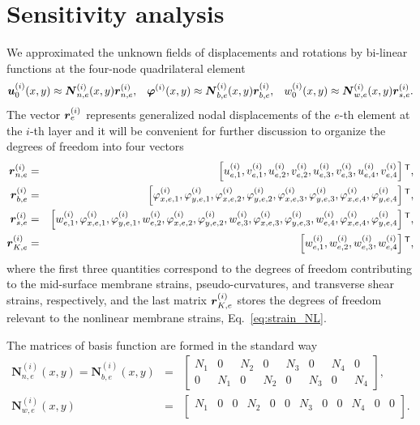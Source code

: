 \documentclass[11pt]{article}
\newcommand{\rot}{\varphi}
\newcommand{\layer}[1]{^{(#1)}}
\newcommand{\el}{_e}
\newcommand{\ele}[1]{_{e,#1}}
\newcommand{\elx}[1]{_{x,e,#1}}
\newcommand{\ely}[1]{_{y,e,#1}}
\newcommand{\elen}{_{n,e}}
\newcommand{\eleb}{_{b,e}}
\newcommand{\eles}{_{s,e}}
\newcommand{\eleNL}{_{K,e}}
\newcommand{\M}[1]{{\boldsymbol #1}}
\newcommand{\elew}{_{w,e}}
\begin{document}
\section{Sensitivity analysis}\label{app:sensitivity_analysis}
We approximated the unknown fields of displacements and rotations by bi-linear functions at the four-node quadrilateral element
\begin{align}
\mtrx{u}\layer{i}_0(x,y) 
\approx
\M{N}\layer{i}\elen(x,y)
\mtrx{r}\layer{i}\elen,
&&
\mtrx{\rot}\layer{i}(x,y) 
\approx
\M{N}\layer{i}\eleb(x,y)
\mtrx{r}\layer{i}\eleb,
&&
\dispz_0\layer{i}(x,y)
\approx
\M{N}\layer{i}\elew(x,y)
\mtrx{r}\layer{i}\eles.
\end{align}
The vector $\mtrx{r}\layer{i}\el$  represents generalized nodal
displacements of the $e$-th element at the $i$-th layer and it will be convenient for further
discussion to organize the degrees of freedom into four vectors 
\begin{eqnarray*}
\mtrx{r}\layer{i}\elen & = & \left[ 
u\layer{i}\ele{1}, v\layer{i}\ele{1}, 
u\layer{i}\ele{2}, v\layer{i}\ele{2}, 
u\layer{i}\ele{3}, v\layer{i}\ele{3}, 
u\layer{i}\ele{4}, v\layer{i}\ele{4}
\right]\trn, \\
\mtrx{r}\layer{i}\eleb & = & \left[ 
\rot\layer{i}\elx{1}, \rot\layer{i}\ely{1}, 
\rot\layer{i}\elx{2}, \rot\layer{i}\ely{2}, 
\rot\layer{i}\elx{3}, \rot\layer{i}\ely{3}, 
\rot\layer{i}\elx{4}, \rot\layer{i}\ely{4}
\right]\trn, \\
\mtrx{r}\layer{i}\eles & = & \left[ 
w\layer{i}\ele{1}, \rot\layer{i}\elx{1}, \rot\layer{i}\ely{1}, 
w\layer{i}\ele{2}, \rot\layer{i}\elx{2}, \rot\layer{i}\ely{2}, 
w\layer{i}\ele{3}, \rot\layer{i}\elx{3}, \rot\layer{i}\ely{3}, 
w\layer{i}\ele{4}, \rot\layer{i}\elx{4}, \rot\layer{i}\ely{4}
\right]\trn,\\
\mtrx{r}\layer{i}\eleNL & = & \left[ 
w\layer{i}\ele{1}, w\layer{i}\ele{2}, w\layer{i}\ele{3}, w\layer{i}\ele{4}
\right]\trn,
\end{eqnarray*}
where the first three quantities correspond to the degrees of freedom contributing to the mid-surface membrane
strains, pseudo-curvatures, and transverse shear strains, respectively, and the last matrix $\mtrx{r}\layer{i}\eleNL$ stores the degrees of freedom
relevant to the nonlinear membrane strains, Eq.~\eqref{eq:strain_NL}. 

The matrices of basis function are formed in the standard way
\begin{eqnarray*}
\M{N}\layer{i}\elen(x,y)
=
\M{N}\layer{i}\eleb(x,y)
& = & 
\begin{bmatrix}
N_1 & 0 & N_2 & 0 & N_3 & 0 & N_4 & 0 \\
 0  & N_1 & 0 & N_2 & 0 & N_3 & 0 & N_4
\end{bmatrix},
\\
\M{N}\layer{i}\elew(x,y)
& = & 
\left[
\begin{array}{cccccccccccc}
N_1 & 0 & 0 & N_2 & 0 & 0 & N_3 & 0 & 0 & N_4 & 0 & 0 \\
\end{array}
\right].
\end{eqnarray*}
\end{document}
